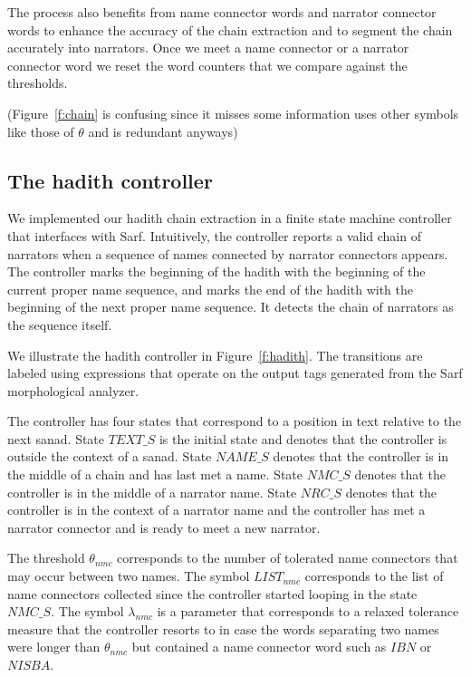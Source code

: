 \documentclass[11pt]{article}
\begin{document}
The process also benefits from name connector 
words and narrator connector words to enhance the
accuracy of the chain extraction and to segment the 
chain accurately into narrators.
Once we meet a name connector or a narrator 
connector word we reset the word counters that we
compare against the thresholds. 

(Figure~\ref{f:chain} is confusing since it misses some information uses other symbols like 
those of $\theta$ and is redundant anyways)


\subsection{The hadith controller}
\label{sec:controller}

We implemented our hadith chain extraction 
in a finite state machine
controller that interfaces with Sarf.
Intuitively, the controller reports a valid chain 
of narrators when a sequence of names
connected by narrator connectors appears. 
The controller marks the beginning of the hadith with 
the beginning of 
the current proper name sequence,
and marks the end of the hadith with the beginning of the 
next proper name sequence. 
It detects the chain of narrators as the sequence itself. 

We illustrate the hadith controller 
in Figure~\ref{f:hadith}. 
The transitions are labeled using expressions
that operate on the output tags 
generated from the Sarf morphological analyzer.

The controller has four states that correspond to 
a position in text relative to the next sanad. 
State $\mathit{TEXT\_S}$ is the initial state and denotes 
that the controller is outside the context of a sanad.
State $\mathit{NAME\_S}$ denotes that the controller is in
the middle of a chain and has last met a name. 
State $\mathit{NMC\_S}$ denotes that the controller is in
the middle of a narrator name.
State $\mathit{NRC\_S}$ denotes that the controller is 
in the context of a narrator name and the controller 
has met a narrator connector and is ready to meet 
a new narrator. 

The threshold $\theta_{\mathit{nmc}}$ 
corresponds to the number of tolerated name connectors 
that may occur between two names. %
The symbol $\mathit{LIST}_{\mathit{nmc}}$ corresponds to the list 
of name connectors collected since the controller
started looping in the state $\mathit{NMC\_S}$.
The symbol $\lambda_{\mathit{nmc}}$ is a parameter 
that corresponds to a relaxed tolerance measure that
the controller resorts to in case the words separating
two names were longer than $\theta_{\mathit{nmc}}$ but 
contained a name connector word such as $\mathit{IBN}$ 
or $\mathit{NISBA}$.
\end{document}
